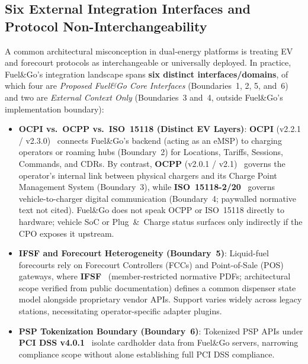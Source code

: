 \subsection{Six External Integration Interfaces and Protocol Non-Interchangeability}
\label{sec:six-interfaces}

A common architectural misconception in dual-energy platforms is treating EV and forecourt protocols as interchangeable or universally deployed. In practice, Fuel\&Go's integration landscape spans \textbf{six distinct interfaces/domains}, of which four are \emph{Proposed Fuel\&Go Core Interfaces} (Boundaries~1, 2, 5, and~6) and two are \emph{External Context Only} (Boundaries~3 and~4, outside Fuel\&Go's implementation boundary):

\begin{itemize}[leftmargin=1.4em, itemsep=2pt]
  \item \textbf{OCPI vs.\ OCPP vs.\ ISO~15118 (Distinct EV Layers)}: \textbf{OCPI} (v2.2.1 / v2.3.0)~\cite{evroaming2025ocpi} connects Fuel\&Go's backend (acting as an eMSP) to charging operators or roaming hubs (Boundary~2) for Locations, Tariffs, Sessions, Commands, and CDRs. By contrast, \textbf{OCPP} (v2.0.1 / v2.1)~\cite{oca2020ocpp201,oca2025ocpp21} governs the operator's internal link between physical chargers and its Charge Point Management System (Boundary~3), while \textbf{ISO~15118-2/20}~\cite{iso15118_2_2014,iso15118_20_2022} governs vehicle-to-charger digital communication (Boundary~4; paywalled normative text not cited). Fuel\&Go does not speak OCPP or ISO~15118 directly to hardware; vehicle SoC or Plug~\&~Charge status surfaces only indirectly if the CPO exposes it upstream.
  \item \textbf{IFSF and Forecourt Heterogeneity (Boundary~5)}: Liquid-fuel forecourts rely on Forecourt Controllers (FCCs) and Point-of-Sale (POS) gateways, where \textbf{IFSF}~\cite{ifsf_specs} (member-restricted normative PDFs; architectural scope verified from public documentation) defines a common dispenser state model alongside proprietary vendor APIs. Support varies widely across legacy stations, necessitating operator-specific adapter plugins.
  \item \textbf{PSP Tokenization Boundary (Boundary~6)}: Tokenized PSP APIs under \textbf{PCI DSS v4.0.1}~\cite{pcissc2024pcidss401} isolate cardholder data from Fuel\&Go servers, narrowing compliance scope without alone establishing full PCI DSS compliance.
\end{itemize}

